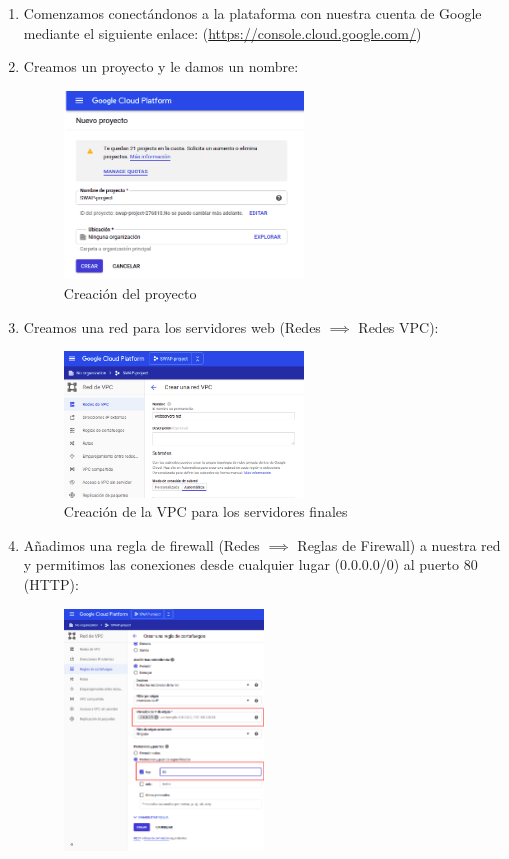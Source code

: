 \documentclass[12pt,spanish]{article}
\begin{document}
\begin{enumerate}
	\item Comenzamos conectándonos a la plataforma con nuestra cuenta de Google mediante el siguiente enlace: (\href{https://console.cloud.google.com/}{https://console.cloud.google.com/})
	\item Creamos un proyecto y le damos un nombre:
	\begin{figure}[H]
		\centering
		\includegraphics[width=0.6\textwidth]{project/create_project.png}
		\caption{Creación del proyecto}
	\end{figure}
	\item Creamos una red para los servidores web (Redes $\implies$ Redes VPC):
	\begin{figure}[H]
		\centering
		\includegraphics[width=0.6\textwidth]{project/vpc_creation.png}
		\caption{Creación de la VPC para los servidores finales}
	\end{figure}
	\newpage
	\item Añadimos una regla de firewall (Redes $\implies$ Reglas de Firewall) a nuestra red y permitimos las conexiones desde cualquier lugar (0.0.0.0/0) al puerto 80 (HTTP):
		\begin{figure}[H]
			\centering
			\includegraphics[width=0.5\textwidth]{project/firewall_creation.png}

\end{figure}
\end{enumerate}
\end{document}
